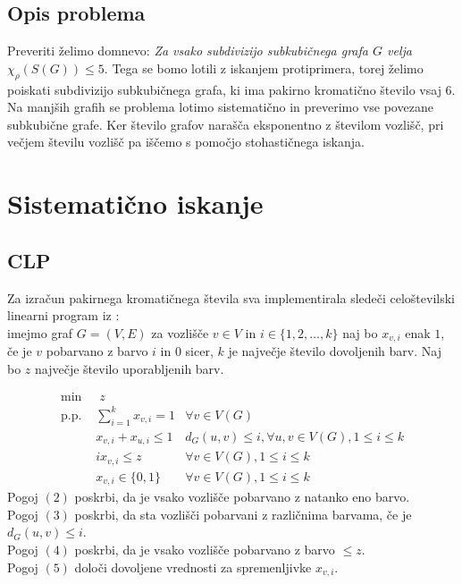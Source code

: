 \documentclass[11pt,a4paper,titlepage]{article}
\begin{document}
\subsection{Opis problema}

Preveriti  želimo domnevo: \emph{Za vsako subdivizijo subkubičnega grafa $G$ velja $\chi_\rho(S(G)) \leq 5$}. Tega se bomo lotili z iskanjem protiprimera, torej želimo poiskati subdivizijo subkubičnega grafa, ki ima pakirno kromatično število vsaj 6. Na manjših grafih se problema lotimo sistematično in preverimo vse povezane subkubične grafe. Ker število grafov narašča eksponentno z številom vozlišč, pri večjem številu vozlišč pa iščemo s pomočjo stohastičnega iskanja.


\section{Sistematično iskanje}

\subsection{CLP}

Za izračun pakirnega kromatičnega števila sva implementirala sledeči celoštevilski linearni program iz \cite{SHAO20153588}: \\
imejmo graf $G=(V, E)$ za vozlišče $v \in V$ in $i \in \{1, 2, \dots, k\}$ naj bo $x_{v, i}$ enak $1$, če je $v$ pobarvano z barvo $i$ in 
$0$ sicer, $k$ je največje število dovoljenih barv. Naj bo $z$ največje število uporabljenih barv. 

\begin{align}
      \label{eq:f.0} \mbox{min}~& \;z& \\
      \label{eq:f.1} \mbox{p.p. } &\sum_{i=1}^{k} x_{v, i} = 1  & \forall v\in V(G)\\
      \label{eq:f.2}&x_{v, i} + x_{u, i} \leq 1& d_G(u, v) \leq i, \forall u, v\in V(G), 1 \leq i \leq k\\
      \label{eq:f.3}&i x_{v, i} \leq z & \forall v \in V(G), 1 \leq i \leq k\\
      \label{eq:f.4}&x_{v, i} \in \{0, 1\} & \forall v \in V(G), 1 \leq i \leq k
\end{align}
Pogoj $(2)$ poskrbi, da je vsako vozlišče pobarvano z natanko eno barvo. \\
Pogoj $(3)$ poskrbi, da sta vozlišči pobarvani z različnima barvama, če je $d_G(u, v) \leq i$. \\
Pogoj $(4)$ poskrbi, da je vsako vozlišče pobarvano z barvo $\leq z$.\\
Pogoj $(5)$ določi dovoljene vrednosti za spremenljivke $x_{v, i}$.
\end{document}
